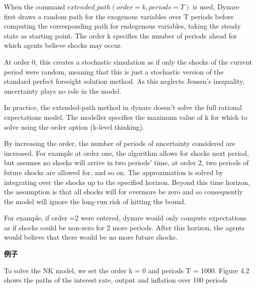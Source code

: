 \documentclass[10pt,math=newtx,citestyle=gb7714-2015,bibstyle=gb7714-2015]{elegantbook}
\begin{document}
{\begin{itemize}
	
\end{itemize}

When the command $extended\_path(order=k,periods=T)$ is used, Dynare first draws a random path for the exogenous variables over T periods before computing the corresponding path for endogenous variables, taking the steady state as starting
point. The order k specifies the number of periods ahead for which agents believe shocks may occur.

At order 0, this creates a stochastic simulation as if only the shocks of the current period were random, meaning that this is just a stochastic version of the standard perfect foresight solution method. As this neglects Jensen’s inequality, uncertainty plays no role in the model.

In practice, the extended-path method in dynare doesn't solve the full rational expectations model. The modeller specifies the maximum value of k for which to solve using the order option (k-level thinking).

By increasing the order, the number of periods of uncertainty
considered are increased. For example at order one, the algorithm allows for shocks next period, but assumes no shocks will arrive in two periods’ time, at order 2, two periods of future shocks are allowed for, and so on. The approximation
is solved by integrating over the shocks up to the specified horizon. Beyond this time horizon, the assumption is that all shocks will for evermore be zero and so consequently the model will ignore the long-run risk of hitting the bound.

For example, if order =2 were entered, dynare would only compute expectations as if shocks could be non-zero for 2 more periods. After this horizon, the agents would believe that there would be no more future shocks.

\textbf{例子}

To solve the NK model, we set the order k = 0 and periods T = 1000. Figure 4.2 shows the paths of the interest rate, output and inflation over 100 periods

}
\end{document}
